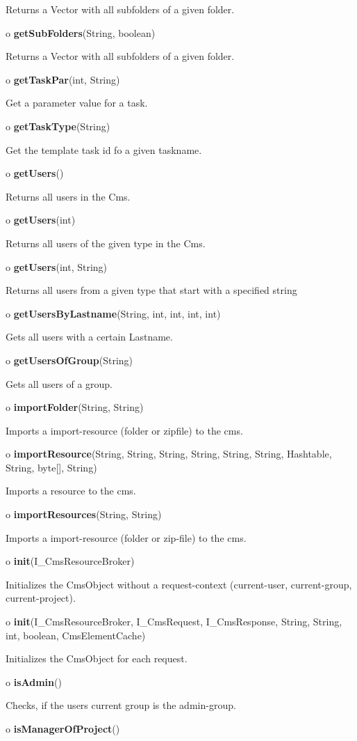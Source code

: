 \begin{description}
Returns a Vector with all subfolders of a given folder.
\item o {\bf getSubFolders}(String, boolean)

Returns a Vector with all subfolders of a given folder.
\item o {\bf getTaskPar}(int, String)

Get a parameter value for a task.
\item o {\bf getTaskType}(String)

Get the template task id fo a given taskname.
\item o {\bf getUsers}()

Returns all users in the Cms.
\item o {\bf getUsers}(int)

Returns all users of the given type in the Cms.
\item o {\bf getUsers}(int, String)

Returns all users from a given type that start with a specified string
\item o {\bf getUsersByLastname}(String, int, int, int, int)

Gets all users with a certain Lastname.
\item o {\bf getUsersOfGroup}(String)

Gets all users of a group.
\item o {\bf importFolder}(String, String)

Imports a import-resource (folder or zipfile) to the cms.
\item o {\bf importResource}(String, String, String, String, String, String,
Hashtable, String, byte[], String)

Imports a resource to the cms.
\item o {\bf importResources}(String, String)

Imports a import-resource (folder or zip-file) to the cms.
\item o {\bf init}(I\_CmsResourceBroker)

Initializes the CmsObject without a request-context (current-user,
current-group, current-project).
\item o {\bf init}(I\_CmsResourceBroker, I\_CmsRequest, I\_CmsResponse,
String, String, int, boolean, CmsElementCache)

Initializes the CmsObject for each request.
\item o {\bf isAdmin}()

Checks, if the users current group is the admin-group.
\item o {\bf isManagerOfProject}()


\end{description}
